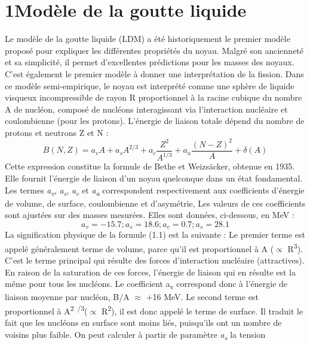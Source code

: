 \section{1Modèle de la goutte liquide }
\textbf{ }Le modèle de la goutte liquide (LDM) a été historiquement le premier modèle proposé pour
expliquer les différentes propriétés du noyau. Malgré son ancienneté et sa simplicité, il permet d'excellentes
prédictions pour les masses des noyaux. C'est également le premier modèle à donner une interprétation de la fission.
Dans ce modèle semi-empirique, le noyau est interprété comme une sphère de liquide visqueux incompressible de rayon R
proportionnel à la racine cubique du nombre A de nucléon, composé de nucléons interagissant via l'interaction nucléaire
et coulombienne (pour les protons). L'énergie de liaison totale dépend du nombre de protons et neutrons Z et N :
 \begin{equation}B\left(N,Z\right)=a_vA+a_sA^{2/3}+a_c\frac{Z^2}{A^{1/3}}+a_a\frac{(N-Z)^2} A+\delta
(A)\end{equation}
Cette expression constitue la formule de Bethe et Weizsäcker, obtenue en 1935. Elle fournit l'énergie de liaison d'un
noyau quelconque dans un état fondamental. Les termes \textit{a}\textit{\textsubscript{v}},
\textit{a}\textit{\textsubscript{s}}, \textit{a}\textit{\textsubscript{c}} et \textit{a}\textit{\textsubscript{a}}
correspondent respectivement aux coefficients d'énergie de volume, de surface, coulombienne et d'asymétrie, Les valeurs
de ces coefficients sont ajustées sur des masses mesurées. Elles sont données, ci-dessous, en MeV :
 \begin{equation}a_v=-15.7;a_s=18.6;a_c=0.7;a_s=28.1\end{equation}
La signification physique de la formule (1.1) est la suivante :
 Le premier terme est appelé généralement terme de volume, parce qu'il est proportionnel à A (${\propto}$
R\textsuperscript{3}). C'est le terme principal qui résulte des forces d'interaction nucléaire (attractives). En raison
de la saturation de ces forces, l'énergie de liaison qui en résulte est la même pour tous les nucléons. Le coefficient
a\textsubscript{v} correspond donc à l'énergie de liaison moyenne par nucléon, B/A ${\approx}$ +16 MeV.
 Le second terme est proportionnel à A\textsuperscript{2~/3}(${\propto}$ R\textsuperscript{2}), il est donc
appelé le terme de surface. Il traduit le fait que les nucléons en surface sont moins liés, puisqu'ils ont un nombre de
voisins plus faible. On peut calculer à partir de paramètre \textit{a}\textit{\textsubscript{s}} la tension
